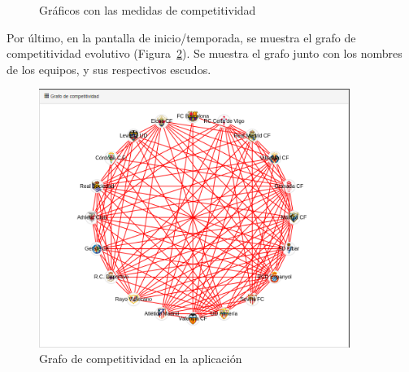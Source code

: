 \begin{figure}[htbp]
\centering
{}
\caption{Gráficos con las medidas de competitividad} \label{fig:medidas}
\end{figure}

Por último, en la pantalla de inicio/temporada, se muestra el grafo de competitividad evolutivo (Figura~\ref{fig:inicio-grafo}). Se muestra el grafo junto con los nombres de los equipos, y sus respectivos escudos.\\


\begin{figure}[htb]
\centering
\includegraphics[width=0.9\textwidth]{imagenes/pantallazos-aplicacion/inicio-grafo}
\caption{Grafo de competitividad en la aplicación}
\label{fig:inicio-grafo}
\end{figure}

